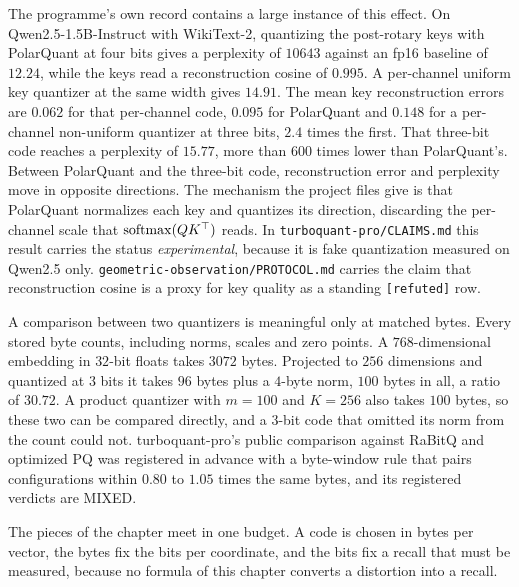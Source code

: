 The programme's own record contains a large instance of this effect. On Qwen2.5-1.5B-Instruct with WikiText-2, quantizing the post-rotary keys with PolarQuant at four bits gives a perplexity of $10643$ against an fp16 baseline of $12.24$, while the keys read a reconstruction cosine of $0.995$. A per-channel uniform key quantizer at the same width gives $14.91$. The mean key reconstruction errors are $0.062$ for that per-channel code, $0.095$ for PolarQuant and $0.148$ for a per-channel non-uniform quantizer at three bits, $2.4$ times the first. That three-bit code reaches a perplexity of $15.77$, more than $600$ times lower than PolarQuant's. Between PolarQuant and the three-bit code, reconstruction error and perplexity move in opposite directions. The mechanism the project files give is that PolarQuant normalizes each key and quantizes its direction, discarding the per-channel scale that $\mathrm{softmax}(QK^{\top})$ reads. In \texttt{turboquant-\allowbreak pro/\allowbreak CLAIMS.md} this result carries the status \emph{experimental}, because it is fake quantization measured on Qwen2.5 only. \texttt{geometric-\allowbreak observation/\allowbreak PROTOCOL.md} carries the claim that reconstruction cosine is a proxy for key quality as a standing \texttt{[refuted]} row.

A comparison between two quantizers is meaningful only at matched bytes. Every stored byte counts, including norms, scales and zero points. A $768$-dimensional embedding in $32$-bit floats takes $3072$ bytes. Projected to $256$ dimensions and quantized at $3$ bits it takes $96$ bytes plus a $4$-byte norm, $100$ bytes in all, a ratio of $30.72$. A product quantizer with $m=100$ and $K=256$ also takes $100$ bytes, so these two can be compared directly, and a $3$-bit code that omitted its norm from the count could not. turboquant-pro's public comparison against RaBitQ and optimized PQ was registered in advance with a byte-window rule that pairs configurations within $0.80$ to $1.05$ times the same bytes, and its registered verdicts are MIXED.

The pieces of the chapter meet in one budget. A code is chosen in bytes per vector, the bytes fix the bits per coordinate, and the bits fix a recall that must be measured, because no formula of this chapter converts a distortion into a recall.

